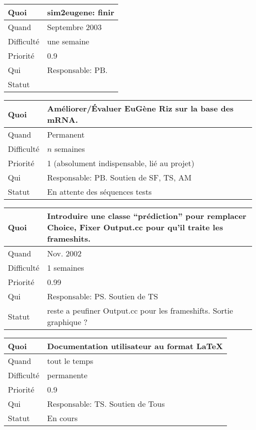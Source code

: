 \documentclass[a4paper,11pt]{article}
\begin{document}
\begin{longtable}{|l|p{7cm}|}\hline
  Quoi & sim2eugene: finir\\\hline
  Quand  &  Septembre 2003\\\hline
  Difficult\'e &  une semaine \\\hline
  Priorit\'e &  0.9\\\hline
  Qui & Responsable: PB.\\\hline
  Statut & \\\hline
\end{longtable}

\begin{longtable}{|l|p{7cm}|}\hline
  Quoi & Am\'eliorer/\'Evaluer EuG\`ene Riz sur la base des mRNA.\\\hline
  Quand  & Permanent\\\hline
  Difficult\'e & $n$ semaines \\\hline
  Priorit\'e & 1 (absolument indispensable, li\'e au projet) \\\hline
  Qui & Responsable: PB. Soutien de SF, TS, AM\\\hline
  Statut & En attente des s\'equences tests\\\hline
\end{longtable}

\begin{longtable}{|l|p{7cm}|}\hline
  Quoi & Introduire une classe ``pr\'ediction'' pour remplacer Choice, Fixer Output.cc pour qu'il traite les frameshits.\\\hline
  Quand  &  Nov. 2002\\\hline
  Difficult\'e &  1 semaines\\\hline
  Priorit\'e & 0.99 \\\hline
  Qui & Responsable: PS. Soutien de TS\\\hline
  Statut & reste a peufiner Output.cc pour les frameshifts. Sortie graphique ?\\\hline
\end{longtable}

\begin{longtable}{|l|p{7cm}|}\hline
  Quoi & Documentation utilisateur au format LaTeX\\\hline
  Quand  &  tout le temps\\\hline
  Difficult\'e &  permanente\\\hline
  Priorit\'e &  0.9 \\\hline
  Qui & Responsable: TS. Soutien de Tous\\\hline
  Statut & En cours\\\hline
\end{longtable}
\end{document}
